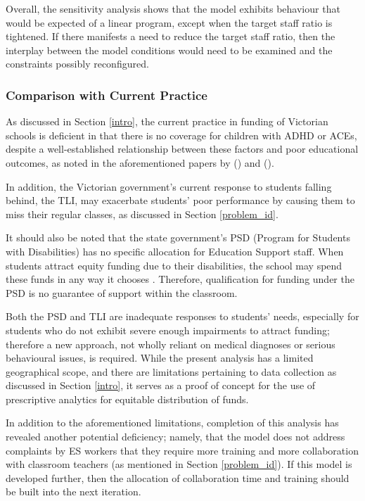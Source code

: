 \documentclass[11pt, a4paper]{article}
\begin{document}
    Overall, the sensitivity analysis shows that the model exhibits behaviour that would be expected of a linear program, except when the target staff ratio is tightened. If there manifests a need to reduce the target staff ratio, then the interplay between the model conditions would need to be examined and the constraints possibly reconfigured.

    \subsubsection{Comparison with Current Practice}

    As discussed in Section \ref{intro}, the current practice in funding of Victorian schools is deficient in that there is no coverage for children with ADHD or ACEs, despite a well-established relationship between these factors and poor educational outcomes, as noted in the aforementioned papers by  () and  (). 
    
    In addition, the Victorian government's current response to students falling behind, the TLI, may exacerbate students' poor performance by causing them to miss their regular classes, as discussed in Section \ref{problem_id}.

    It should also be noted that the state government's PSD (Program for Students with Disabilities) has no specific allocation for Education Support staff. When students attract equity funding due to their disabilities, the school may spend these funds in any way it chooses \parencite{srp_vic}. Therefore, qualification for funding under the PSD is no guarantee of support within the classroom. 

    Both the PSD and TLI are inadequate responses to students' needs, especially for students who do not exhibit severe enough impairments to attract funding; therefore a new approach, not wholly reliant on medical diagnoses or serious behavioural issues, is required. While the present analysis has a limited geographical scope, and there are limitations pertaining to data collection as discussed in Section \ref{intro}, it serves as a proof of concept for the use of prescriptive analytics for equitable distribution of funds.

    In addition to the aforementioned limitations, completion of this analysis has revealed another potential deficiency; namely, that the model does not address complaints by ES workers that they require more training and more collaboration with classroom teachers (as mentioned in Section \ref{problem_id}). If this model is developed further, then the allocation of collaboration time and training should be built into the next iteration. 
\end{document}
